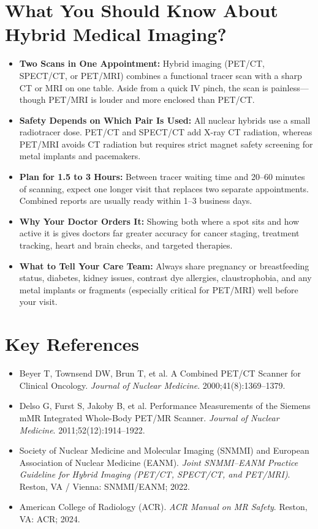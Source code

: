 \section{What You Should Know About Hybrid Medical Imaging?}
\begin{itemize}
    \item \textbf{Two Scans in One Appointment:} Hybrid imaging (PET/CT, SPECT/CT, or PET/MRI) combines a functional tracer scan with a sharp CT or MRI on one table. Aside from a quick IV pinch, the scan is painless---though PET/MRI is louder and more enclosed than PET/CT.
    \item \textbf{Safety Depends on Which Pair Is Used:} All nuclear hybrids use a small radiotracer dose. PET/CT and SPECT/CT add X-ray CT radiation, whereas PET/MRI avoids CT radiation but requires strict magnet safety screening for metal implants and pacemakers.
    \item \textbf{Plan for 1.5 to 3 Hours:} Between tracer waiting time and 20--60 minutes of scanning, expect one longer visit that replaces two separate appointments. Combined reports are usually ready within 1--3 business days.
    \item \textbf{Why Your Doctor Orders It:} Showing both where a spot sits and how active it is gives doctors far greater accuracy for cancer staging, treatment tracking, heart and brain checks, and targeted therapies.
    \item \textbf{What to Tell Your Care Team:} Always share pregnancy or breastfeeding status, diabetes, kidney issues, contrast dye allergies, claustrophobia, and any metal implants or fragments (especially critical for PET/MRI) well before your visit.
\end{itemize}

\section{Key References}
\begin{itemize}
    \item Beyer T, Townsend DW, Brun T, et al. A Combined PET/CT Scanner for Clinical Oncology. \textit{Journal of Nuclear Medicine}. 2000;41(8):1369--1379.
    \item Delso G, Furst S, Jakoby B, et al. Performance Measurements of the Siemens mMR Integrated Whole-Body PET/MR Scanner. \textit{Journal of Nuclear Medicine}. 2011;52(12):1914--1922.
    \item Society of Nuclear Medicine and Molecular Imaging (SNMMI) and European Association of Nuclear Medicine (EANM). \textit{Joint SNMMI--EANM Practice Guideline for Hybrid Imaging (PET/CT, SPECT/CT, and PET/MRI)}. Reston, VA / Vienna: SNMMI/EANM; 2022.
    \item American College of Radiology (ACR). \textit{ACR Manual on MR Safety}. Reston, VA: ACR; 2024.
\end{itemize}
